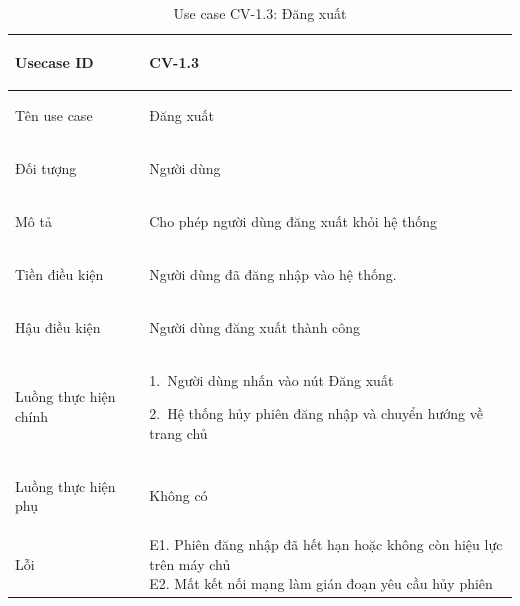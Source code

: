 \begin{table}[H]
    \centering
    \small
    \renewcommand{\arraystretch}{1.0}
    \begin{tabularx}{\textwidth}{|
        >{\bfseries\raggedright\arraybackslash}p{3.2cm}|Y|}
        \hline

        Usecase ID& CV-1.3 \\ \hline

        Tên use case & Đăng xuất \\ \hline

        Đối tượng & Người dùng \\ \hline

        Mô tả & Cho phép người dùng đăng xuất khỏi hệ thống \\ \hline

        Tiền điều kiện &
        \parbox[t]{\hsize}{
            Người dùng đã đăng nhập vào hệ thống.\par
        } \\
        \hline

        Hậu điều kiện & Người dùng đăng xuất thành công \\ \hline

        Luồng thực hiện chính&
        \parbox[t]{\hsize}{
            1.\ Người dùng nhấn vào nút Đăng xuất\par
            2.\ Hệ thống hủy phiên đăng nhập và chuyển hướng về trang chủ}\\
        \hline

        Luồng thực hiện phụ& Không có \\
        \hline

        Lỗi &
        \parbox[t]{\hsize}{
            E1. Phiên đăng nhập đã hết hạn hoặc không còn hiệu lực trên máy chủ\\
            E2. Mất kết nối mạng làm gián đoạn yêu cầu hủy phiên
        }\\
        \hline

    \end{tabularx}

    \caption{Use case CV-1.3: Đăng xuất}
    \label{tab:usecase-cv13}
\end{table}


